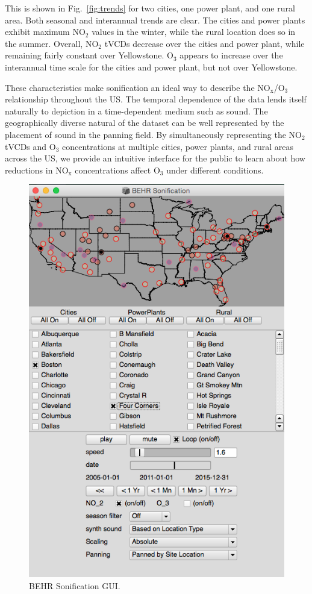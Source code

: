 \documentclass[a4paper,10pt,oneside]{article}
\newcommand{\ce}[1]{$\mathrm{#1}$}
\begin{document}
\begin{sloppy}
This is shown in Fig.~\ref{fig:trends} for two cities, one power plant, and one rural area. Both seasonal and interannual trends are clear. The cities and power plants exhibit maximum \ce{NO_2} values in the winter, while the rural location does so in the summer. Overall, \ce{NO_2} tVCDs decrease over the cities and power plant, while remaining fairly constant over Yellowstone. \ce{O_3} appears to increase over the interannual time scale for the cities and power plant, but not over Yellowstone. 

These characteristics make sonification an ideal way to describe the \ce{NO_x}/\ce{O_3} relationship throughout the US. The temporal dependence of the data lends itself naturally to depiction in a time-dependent medium such as sound. The geographically diverse natural of the dataset can be well represented by the placement of sound in the panning field. By simultaneously representing the \ce{NO_2} tVCDs and \ce{O_3} concentrations at multiple cities, power plants, and rural areas across the US, we provide an intuitive interface for the public to learn about how reductions in \ce{NO_x} concentrations affect \ce{O_3} under different conditions.
	
\begin{figure}[t]
\centering
\includegraphics[width=0.95\columnwidth]{figs/gui_revised.png}
\caption{BEHR Sonification GUI.}
\label{fig:gui}
\end{figure}


\end{sloppy}
\end{document}

